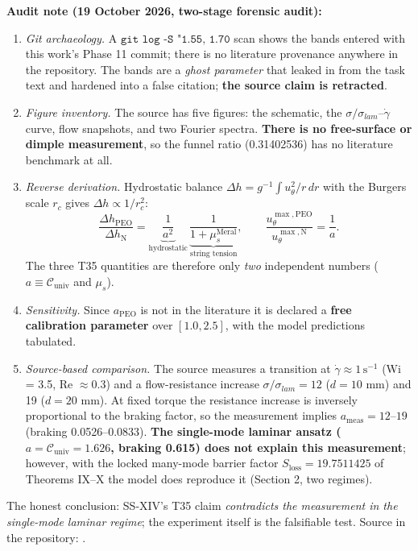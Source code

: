 \documentclass[12pt,a4paper]{article}
\begin{document}
\textbf{Audit note (19 October 2026, two-stage forensic audit):}
\begin{enumerate}
    \item \textit{Git archaeology.} A $\texttt{git log -S "1.55, 1.70}$ scan
    shows the bands entered with this work's Phase 11 commit; there is no
    literature provenance anywhere in the repository. The bands are a
    \emph{ghost parameter} that leaked in from the task text and hardened into
    a false citation; \textbf{the source claim is retracted}.
    \item \textit{Figure inventory.} The source has five figures: the
    schematic, the $\sigma/\sigma_{lam}$--$\dot\gamma$ curve, flow
    snapshots, and two Fourier spectra. \textbf{There is no free-surface or
    dimple measurement}, so the funnel ratio (0.31402536) has no literature
    benchmark at all.
    \item \textit{Reverse derivation.} Hydrostatic balance
    $\Delta h = g^{-1}\int u_\theta^2/r\,dr$ with the Burgers scale $r_c$
    gives $\Delta h\propto 1/r_c^2$:
    \begin{equation}
    \frac{\Delta h_{\mathrm{PEO}}}{\Delta h_{\mathrm{N}}}
    =\underbrace{\frac{1}{a^2}}_{\text{hydrostatic}}\,
    \underbrace{\frac{1}{1+\mu_s^{\mathrm{Meral}}}}_{\text{string tension}},
    \qquad
    \frac{u_\theta^{\max,\mathrm{PEO}}}{u_\theta^{\max,\mathrm{N}}}=\frac{1}{a}.
    \end{equation}
    The three T35 quantities are therefore only \emph{two} independent
    numbers ($a\equiv\mathcal{C}_{\mathrm{univ}}$ and $\mu_s$).
    \item \textit{Sensitivity.} Since $a_{\mathrm{PEO}}$ is not in the
    literature it is declared a \textbf{free calibration parameter} over
    $[1.0,2.5]$, with the model predictions tabulated.
    \item \textit{Source-based comparison.} The source measures a transition
    at $\dot\gamma\approx 1\,\mathrm{s^{-1}}$ (Wi = 3.5, Re $\approx 0.3$) and
    a flow-resistance increase $\sigma/\sigma_{lam}=12$ ($d=10$ mm) and 19
    ($d=20$ mm). At fixed torque the resistance increase is inversely
    proportional to the braking factor, so the measurement implies
    $a_{\mathrm{meas}}=12$--$19$ (braking 0.0526--0.0833). \textbf{The
    single-mode laminar ansatz ($a=\mathcal{C}_{\mathrm{univ}}=1.626$,
    braking 0.615) does not explain this measurement}; however, with the
    locked many-mode barrier factor $S_{\mathrm{loss}}=19.7511425$ of
    Theorems IX--X the model does reproduce it (Section 2, two regimes).
\end{enumerate}
The honest conclusion: SS-XIV's T35 claim \emph{contradicts the measurement
in the single-mode laminar regime}; the experiment itself is the falsifiable
test. Source in the repository:
.
\end{document}
